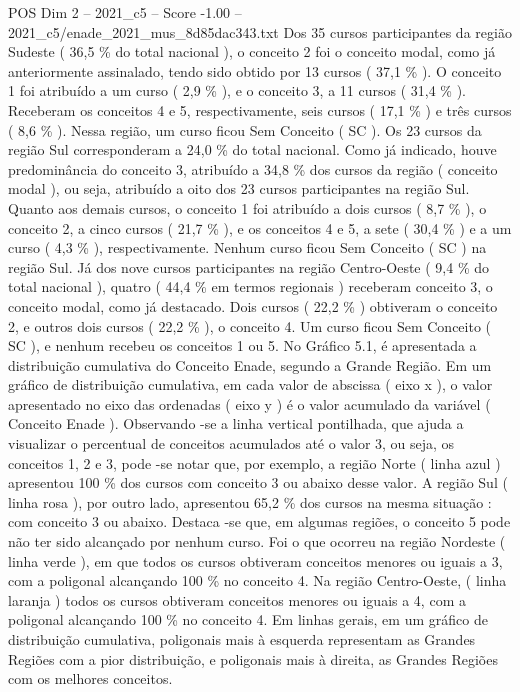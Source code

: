 \begin{textsample}{POS Dim 2 – 2021\_c5 – Score -1.00 – 2021\_c5/enade\_2021\_mus\_8d85dac343.txt}
Dos 35 cursos participantes da região Sudeste ( 36,5 \% do total nacional ), o conceito 2 foi o conceito modal, como já anteriormente assinalado, tendo sido obtido por 13 cursos ( 37,1 \% ).
O conceito 1 foi atribuído a um curso ( 2,9 \% ), e o conceito 3, a 11 cursos ( 31,4 \% ).
Receberam os conceitos 4 e 5, respectivamente, seis cursos ( 17,1 \% ) e três cursos ( 8,6 \% ).
Nessa região, um curso ficou Sem Conceito ( SC ).
Os 23 cursos da região Sul corresponderam a 24,0 \% do total nacional.
Como já indicado, houve predominância do conceito 3, atribuído a 34,8 \% dos cursos da região ( conceito modal ), ou seja, atribuído a oito dos 23 cursos participantes na região Sul.
Quanto aos demais cursos, o conceito 1 foi atribuído a dois cursos ( 8,7 \% ), o conceito 2, a cinco cursos ( 21,7 \% ), e os conceitos 4 e 5, a sete ( 30,4 \% ) e a um curso ( 4,3 \% ), respectivamente.
Nenhum curso ficou Sem Conceito ( SC ) na região Sul.
Já dos nove cursos participantes na região Centro-Oeste ( 9,4 \% do total nacional ), quatro ( 44,4 \% em termos regionais ) receberam conceito 3, o conceito modal, como já destacado.
Dois cursos ( 22,2 \% ) obtiveram o conceito 2, e outros dois cursos ( 22,2 \% ), o conceito 4.
Um curso ficou Sem Conceito ( SC ), e nenhum recebeu os conceitos 1 ou 5.
No Gráfico 5.1, é apresentada a distribuição cumulativa do Conceito Enade, segundo a Grande Região.
Em um gráfico de distribuição cumulativa, em cada valor de abscissa ( eixo x ), o valor apresentado no eixo das ordenadas ( eixo y ) é o valor acumulado da variável ( Conceito Enade ).
Observando -se a linha vertical pontilhada, que ajuda a visualizar o percentual de conceitos acumulados até o valor 3, ou seja, os conceitos 1, 2 e 3, pode -se notar que, por exemplo, a região Norte ( linha azul ) apresentou 100 \% dos cursos com conceito 3 ou abaixo desse valor.
A região Sul ( linha rosa ), por outro lado, apresentou 65,2 \% dos cursos na mesma situação : com conceito 3 ou abaixo.
Destaca -se que, em algumas regiões, o conceito 5 pode não ter sido alcançado por nenhum curso.
Foi o que ocorreu na região Nordeste ( linha verde ), em que todos os cursos obtiveram conceitos menores ou iguais a 3, com a poligonal alcançando 100 \% no conceito 4.
Na região Centro-Oeste, ( linha laranja ) todos os cursos obtiveram conceitos menores ou iguais a 4, com a poligonal alcançando 100 \% no conceito 4.
Em linhas gerais, em um gráfico de distribuição cumulativa, poligonais mais à esquerda representam as Grandes Regiões com a pior distribuição, e poligonais mais à direita, as Grandes Regiões com os melhores conceitos.

\end{textsample}
